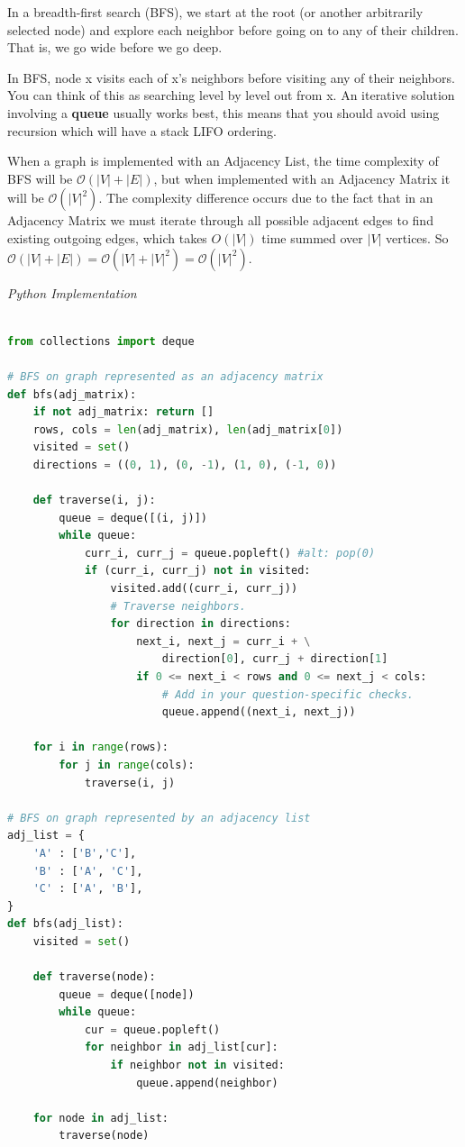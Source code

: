\documentclass{article}
\newcommand{\bigO}{\mathcal{O}}
\begin{document}
    In a breadth-first search (BFS), we start at the root (or another arbitrarily selected node) and explore each neighbor before going on to any of their children. That is, we go wide before we go deep. 
    
    In BFS, node x visits each of x's neighbors before visiting any of their neighbors. You can think of this as searching level by level out from x. An iterative solution involving a \textbf{queue} usually works best, this means that you should avoid using recursion which will have a stack LIFO ordering.
    
    When a graph is implemented with an Adjacency List, the time complexity of BFS will be $\bigO(|V| + |E|)$, but when implemented with an Adjacency Matrix it will be $\bigO(|V|^2)$. The complexity difference occurs due to the fact that in an Adjacency Matrix we must iterate through all possible adjacent edges to find existing outgoing edges, which takes $O(|V|)$ time summed over $|V|$ vertices. So $\bigO(|V| + |E|) = \bigO(|V| + |V|^2) = \bigO(|V|^2)$.
    
\vspace{8pt} \emph{Python Implementation}
\begin{lstlisting}[language=Python]

from collections import deque

# BFS on graph represented as an adjacency matrix
def bfs(adj_matrix):
    if not adj_matrix: return []
    rows, cols = len(adj_matrix), len(adj_matrix[0])
    visited = set()
    directions = ((0, 1), (0, -1), (1, 0), (-1, 0))

    def traverse(i, j):
        queue = deque([(i, j)])
        while queue:
            curr_i, curr_j = queue.popleft() #alt: pop(0)
            if (curr_i, curr_j) not in visited:
                visited.add((curr_i, curr_j))
                # Traverse neighbors.
                for direction in directions:
                    next_i, next_j = curr_i + \
                        direction[0], curr_j + direction[1]
                    if 0 <= next_i < rows and 0 <= next_j < cols:
                        # Add in your question-specific checks.
                        queue.append((next_i, next_j))

    for i in range(rows):
        for j in range(cols):
            traverse(i, j)
            
# BFS on graph represented by an adjacency list 
adj_list = {
    'A' : ['B','C'],
    'B' : ['A', 'C'],
    'C' : ['A', 'B'],
}
def bfs(adj_list):
    visited = set()
    
    def traverse(node):
        queue = deque([node])
        while queue:
            cur = queue.popleft()
            for neighbor in adj_list[cur]:
                if neighbor not in visited:
                    queue.append(neighbor)
                    
    for node in adj_list:
        traverse(node)
\end{lstlisting}
\end{document}

